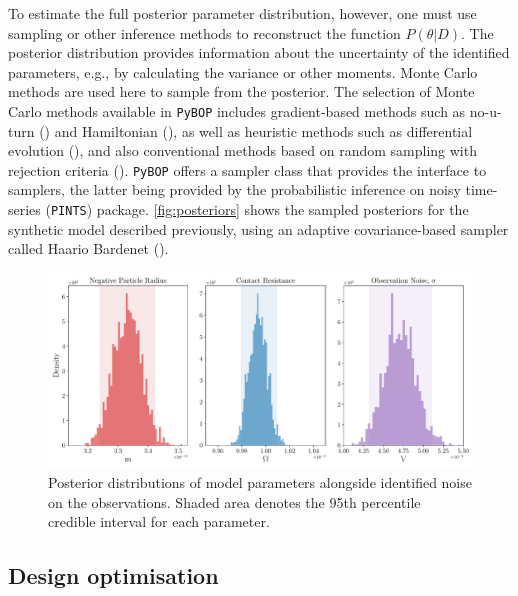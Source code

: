 \documentclass[
]{article}
\begin{document}
To estimate the full posterior parameter distribution, however, one must
use sampling or other inference methods to reconstruct the function
\(P(\theta|D)\). The posterior distribution provides information about
the uncertainty of the identified parameters, e.g., by calculating the
variance or other moments. Monte Carlo methods are used here to sample
from the posterior. The selection of Monte Carlo methods available in
\texttt{PyBOP} includes gradient-based methods such as no-u-turn
() and Hamiltonian
(), as well as
heuristic methods such as differential evolution
(), and also conventional
methods based on random sampling with rejection criteria
().
\texttt{PyBOP} offers a sampler class that provides the interface to
samplers, the latter being provided by the probabilistic inference on
noisy time-series (\texttt{PINTS}) package. \autoref{fig:posteriors}
shows the sampled posteriors for the synthetic model described
previously, using an adaptive covariance-based sampler called Haario
Bardenet ().

\begin{figure}
\centering
\includegraphics[width=1\textwidth,height=\textheight]{figures/joss/posteriors.pdf}
\caption{Posterior distributions of model parameters alongside
identified noise on the observations. Shaded area denotes the 95th
percentile credible interval for each parameter. \label{fig:posteriors}}
\end{figure}

\subsection{Design optimisation}\label{design-optimisation}
\end{document}
